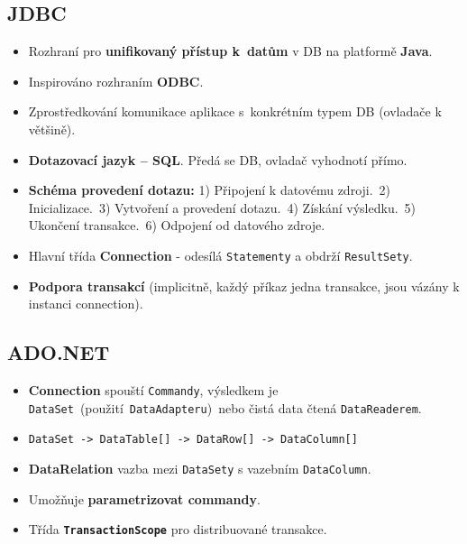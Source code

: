 \subsection{JDBC}
\begin{itemize}
    \item Rozhraní pro \textbf{unifikovaný přístup k datům} v DB na platformě \textbf{Java}.
    \item Inspirováno rozhraním \textbf{ODBC}.
    \item Zprostředkování komunikace aplikace s konkrétním typem DB (ovladače k většině).
    \item \textbf{Dotazovací jazyk – SQL}. Předá se DB, ovladač vyhodnotí přímo.
    \item \textbf{Schéma provedení dotazu:} 1) Připojení k datovému zdroji. 2) Inicializace. 3) Vytvoření a provedení dotazu. 4) Získání výsledku. 5) Ukončení transakce. 6) Odpojení od datového zdroje.
    \item Hlavní třída \textbf{Connection} - odesílá \texttt{Statementy} a obdrží \texttt{ResultSety}.
    \item \textbf{Podpora transakcí }(implicitně, každý příkaz jedna transakce, jsou vázány k instanci connection).
\end{itemize}

\subsection{ADO.NET}
\begin{itemize}
    \item \textbf{Connection} spouští \texttt{Commandy}, výsledkem je \texttt{DataSet} (použití \texttt{DataAdapteru}) nebo čistá data čtená \texttt{DataReaderem}.
    \item \texttt{DataSet -> DataTable[] -> DataRow[] -> DataColumn[]}
    \item \textbf{DataRelation} vazba mezi \texttt{DataSety} s vazebním \texttt{DataColumn}.
    \item Umožňuje \textbf{parametrizovat commandy}.
    \item Třída \textbf{\texttt{TransactionScope}} pro distribuované transakce.
\end{itemize}


